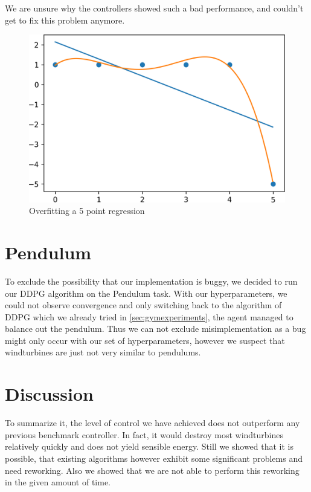 \documentclass[hyperref,beleg]{cgvpub}
\begin{document}
We are unsure why the controllers showed such a bad performance, and couldn't get to fix this problem anymore.

\begin{figure}
  \centering
  \includegraphics[width=0.5\linewidth]{images/overfit.png}
  \caption{Overfitting a 5 point regression}
  \label{fig:overfit}
\end{figure}


\section{Pendulum}
To exclude the possibility that our implementation is buggy, we decided to run our DDPG algorithm on the Pendulum task. With our hyperparameters, we could not observe convergence and only switching back to the algorithm of \ac{DDPG} which we already tried in \ref{sec:gymexperiments}, the agent managed to balance out the pendulum. Thus we can not exclude misimplementation as a bug might only occur with our set of hyperparameters, however we suspect that windturbines are just not very similar to pendulums.


\section{Discussion}

To summarize it, the level of control we have achieved does not outperform any previous benchmark controller. In fact, it would destroy most windturbines relatively quickly and does not yield sensible energy. Still we showed that it is possible, that existing algorithms however exhibit some significant problems and need reworking. Also we showed that we are not able to perform this reworking in the given amount of time.
\end{document}
